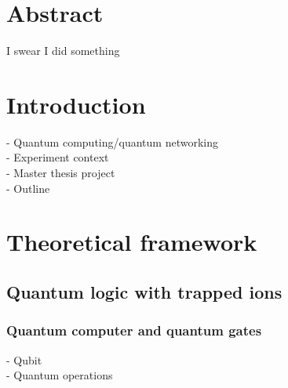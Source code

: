 \documentclass[english, a4paper, 12pt, twoside]{article}
\numberwithin{equation}{section} %
\begin{document}
{

}
\restoregeometry %

\thispagestyle{plain} %
\clearpage\mbox{}\clearpage %

\newpage

\section*{Abstract}
I swear I did something

\newpage


\newpage
\tableofcontents

\newpage
\listoffigures

\newpage
{} %
\setcounter{page}{1} %

\section{Introduction} %

- Quantum computing/quantum networking \\
- Experiment context\\
- Master thesis project\\
- Outline\\

\section{Theoretical framework}
\subsection{Quantum logic with trapped ions}
\subsubsection{Quantum computer and quantum gates}
- Qubit\\
- Quantum operations\\
\end{document}
